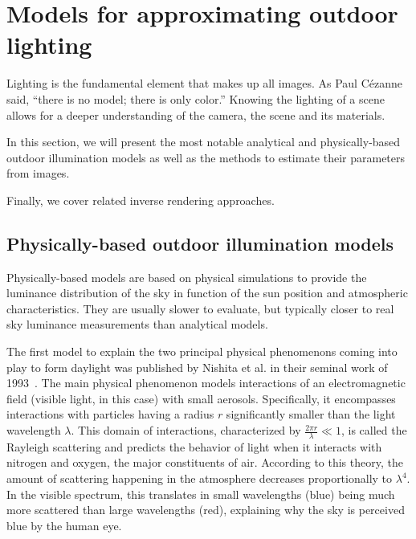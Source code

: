 

\section{Models for approximating outdoor lighting}

Lighting is the fundamental element that makes up all images. As Paul Cézanne said, ``there is no model; there is only color.'' Knowing the lighting of a scene allows for a deeper understanding of the camera, the scene and its materials.

In this section, we will present the most notable analytical and physically-based outdoor illumination models as well as the methods to estimate their parameters from images.

Finally, we cover related inverse rendering approaches.


\subsection{Physically-based outdoor illumination models}

Physically-based models are based on physical simulations to provide the luminance distribution of the sky in function of the sun position and atmospheric characteristics. They are usually slower to evaluate, but typically closer to real sky luminance measurements than analytical models.

The first model to explain the two principal physical phenomenons coming into play to form daylight was published by Nishita et al. in their seminal work of 1993~\cite{nishita1993display}. The main physical phenomenon models interactions of an electromagnetic field (visible light, in this case) with small aerosols. Specifically, it encompasses interactions with particles having a radius $r$ significantly smaller than the light wavelength $\lambda$. This domain of interactions, characterized by $\frac{2\pi r}{\lambda} \ll 1$, is called the Rayleigh scattering and predicts the behavior of light when it interacts with nitrogen and oxygen, the major constituents of air. According to this theory, the amount of scattering happening in the atmosphere decreases proportionally to $\lambda^4$. In the visible spectrum, this translates in small wavelengths (blue) being much more scattered than large wavelengths (red), explaining why the sky is perceived blue by the human eye.

